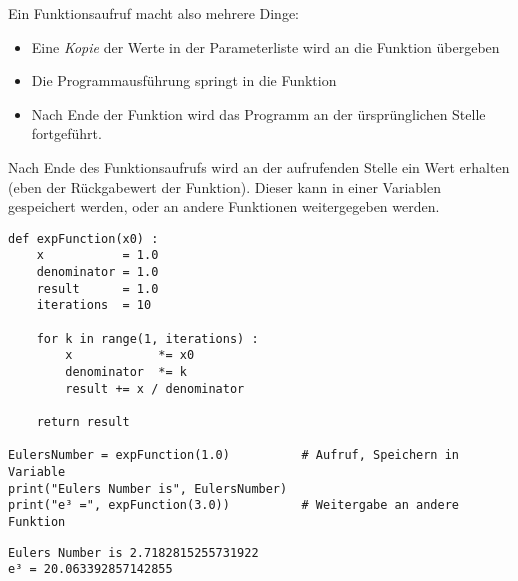 Ein Funktionsaufruf macht also mehrere Dinge:
\begin{itemize}
\item Eine \emph{Kopie} der Werte in der Parameterliste wird an die Funktion übergeben
\item Die Programmausführung springt in die Funktion
\item Nach Ende der Funktion wird das Programm an der ürsprünglichen Stelle fortgeführt.
\end{itemize}
Nach Ende des Funktionsaufrufs wird an der aufrufenden Stelle ein Wert erhalten (eben der Rückgabewert der Funktion). Dieser kann in einer Variablen gespeichert werden, oder an andere Funktionen weitergegeben werden.

\begin{codebox}
\begin{verbatim}
def expFunction(x0) :
    x           = 1.0
    denominator = 1.0
    result      = 1.0
    iterations  = 10
  
    for k in range(1, iterations) :
        x            *= x0
        denominator  *= k
        result += x / denominator
    
    return result

EulersNumber = expFunction(1.0)          # Aufruf, Speichern in Variable
print("Eulers Number is", EulersNumber)
print("e³ =", expFunction(3.0))          # Weitergabe an andere Funktion
\end{verbatim}
\end{codebox}

\begin{cmdbox}
\begin{verbatim}
Eulers Number is 2.7182815255731922
e³ = 20.063392857142855
\end{verbatim}
\end{cmdbox}

